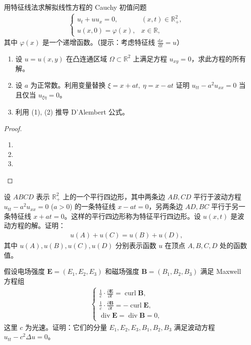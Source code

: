 \documentclass[../../main.tex]{subfiles}%
\begin{document}
\begin{example}
用特征线法求解拟线性方程的 Cauchy 初值问题
\begin{align*}
\begin{cases}
u_t+uu_x=0, & (x,t)\in\mathbb{R}_+^2, \\
u(x,0)=\varphi(x), & x\in\mathbb{R},
\end{cases}
\end{align*}
其中 $\varphi(x)$ 是一个递增函数。（提示：考虑特征线 $\frac{\mathrm{d}x}{\mathrm{d}t}=u$）
\end{example}

\begin{proposition}
\begin{enumerate}[(1)]
\item 设 $u=u(x,y)$ 在凸连通区域 $\Omega\subset\mathbb{R}^2$ 上满足方程 $u_{xy}=0$，求此方程的所有解。
\item 设 $a$ 为正常数。利用变量替换 $\xi=x+at,\ \eta=x-at$ 证明 $u_{tt}-a^2u_{xx}=0$ 当且仅当 $u_{\xi\eta}=0$。
\item 利用 (1), (2) 推导 D'Alembert 公式。
\end{enumerate}
\end{proposition}
\begin{proof}
\begin{enumerate}[(1)]
\item 

\item 

\item 
\end{enumerate}
\end{proof}

\begin{example}
设 $ABCD$ 表示 $\mathbb{R}_+^2$ 上的一个平行四边形，其中两条边 $AB,CD$ 平行于波动方程 $u_{tt}-a^2u_{xx}=0$ ($a>0$) 的一条特征线 $x-at=0$，另两条边 $AD,BC$ 平行于另一条特征线 $x+at=0$。这样的平行四边形称为特征平行四边形。设 $u(x,t)$ 是波动方程的解。证明：
\begin{align*}
u(A)+u(C)=u(B)+u(D),
\end{align*}
其中 $u(A),u(B),u(C),u(D)$ 分别表示函数 $u$ 在顶点 $A,B,C,D$ 处的函数值。
\end{example}

\begin{example}
假设电场强度 $\bm{E}=(E_1,E_2,E_3)$ 和磁场强度 $\bm{B}=(B_1,B_2,B_3)$ 满足 Maxwell 方程组
\begin{align*}
\begin{cases}
\frac{1}{c}\cdot\frac{\partial \bm{E}}{\partial t}=\operatorname{curl}\bm{B}, \\
\frac{1}{c}\cdot\frac{\partial \bm{B}}{\partial t}=-\operatorname{curl}\bm{E}, \\
\operatorname{div}\bm{E}=\operatorname{div}\bm{B}=0,
\end{cases}
\end{align*}
这里 $c$ 为光速。证明：它们的分量 $E_1,E_2,E_3,B_1,B_2,B_3$ 满足波动方程 $u_{tt}-c^2\Delta u=0$。
\end{example}
\end{document}
